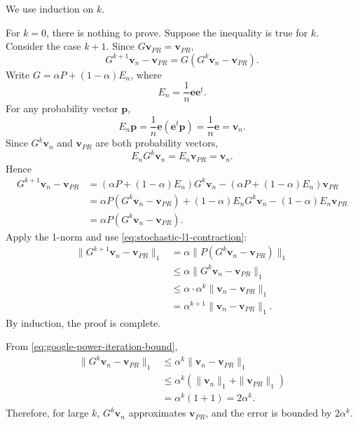 \begin{pfbox}
We use induction on $k$.

For $k=0$, there is nothing to prove. Suppose the inequality is true for $k$. Consider the case $k+1$. Since $G\mathbf{v}_{PR}=\mathbf{v}_{PR}$,
\[
G^{k+1}\mathbf{v}_n-\mathbf{v}_{PR}
=
G(G^k\mathbf{v}_n-\mathbf{v}_{PR}).
\]
Write $G=\alpha P+(1-\alpha)E_n$, where
\[
E_n
=
\frac{1}{n}\mathbf{e}\mathbf{e}^t.
\]
For any probability vector $\mathbf{p}$,
\[
E_n\mathbf{p}
=
\frac{1}{n}\mathbf{e}(\mathbf{e}^t\mathbf{p})
=
\frac{1}{n}\mathbf{e}
=
\mathbf{v}_n.
\]
Since $G^k\mathbf{v}_n$ and $\mathbf{v}_{PR}$ are both probability vectors,
\[
E_nG^k\mathbf{v}_n
=
E_n\mathbf{v}_{PR}
=
\mathbf{v}_n.
\]
Hence
\[
\begin{aligned}
G^{k+1}\mathbf{v}_n-\mathbf{v}_{PR}
&=
\left(\alpha P+(1-\alpha)E_n\right)G^k\mathbf{v}_n
-
\left(\alpha P+(1-\alpha)E_n\right)\mathbf{v}_{PR}\\
&=
\alpha P(G^k\mathbf{v}_n-\mathbf{v}_{PR})
+(1-\alpha)E_nG^k\mathbf{v}_n
-(1-\alpha)E_n\mathbf{v}_{PR}\\
&=
\alpha P(G^k\mathbf{v}_n-\mathbf{v}_{PR}).
\end{aligned}
\]
Apply the 1-norm and use \eqref{eq:stochastic-l1-contraction}:
\[
\begin{aligned}
\|G^{k+1}\mathbf{v}_n-\mathbf{v}_{PR}\|_1
&=
\alpha\|P(G^k\mathbf{v}_n-\mathbf{v}_{PR})\|_1\\
&\le
\alpha\|G^k\mathbf{v}_n-\mathbf{v}_{PR}\|_1\\
&\le
\alpha\cdot\alpha^k\|\mathbf{v}_n-\mathbf{v}_{PR}\|_1\\
&=
\alpha^{k+1}\|\mathbf{v}_n-\mathbf{v}_{PR}\|_1.
\end{aligned}
\]
By induction, the proof is complete.
\end{pfbox}

\begin{remark}
From \eqref{eq:google-power-iteration-bound},
\[
\begin{aligned}
\|G^k\mathbf{v}_n-\mathbf{v}_{PR}\|_1
&\le
\alpha^k\|\mathbf{v}_n-\mathbf{v}_{PR}\|_1\\
&\le
\alpha^k(\|\mathbf{v}_n\|_1+\|\mathbf{v}_{PR}\|_1)\\
&=
\alpha^k(1+1)
=
2\alpha^k.
\end{aligned}
\]
Therefore, for large $k$, $G^k\mathbf{v}_n$ approximates $\mathbf{v}_{PR}$, and the error is bounded by $2\alpha^k$.
\end{remark}



